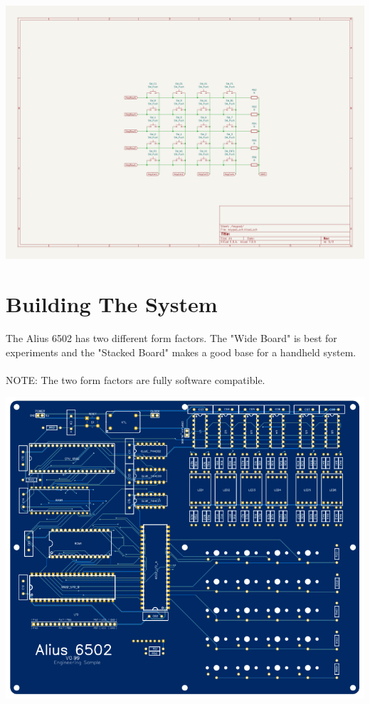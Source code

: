 \documentclass{ol-softwaremanual}
\begin{document}
\begin{ffcode}
\begin{center}
\includegraphics[angle=90,origin=c, width=14.1cm]{Keypad.PNG}
\end{center}

\pagebreak

\section{Building The System}
The Alius 6502 has two different form factors.  The "Wide Board" is best for experiments and the "Stacked Board" makes a good base for a handheld system.\\
\\
NOTE: The two form factors are fully software compatible.\\

\begin{center}
\includegraphics[width=14cm]{Wide_Board.PNG}


\end{center}
\end{ffcode}
\end{document}

